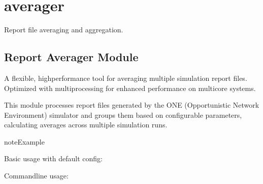 \documentclass[a4paper,11pt,english,openany,oneside]{sphinxmanual}
\begin{document}
\section{averager}
\label{\detokenize{modules/core:averager}}
\sphinxAtStartPar
Report file averaging and aggregation.

\subsection{Report Averager Module}
\label{\detokenize{modules/core:report-averager-module}}\label{\detokenize{modules/core:module-core.averager}}
\sphinxAtStartPar
A flexible, high\sphinxhyphen{}performance tool for averaging multiple simulation report files.
Optimized with multiprocessing for enhanced performance on multi\sphinxhyphen{}core systems.

\sphinxAtStartPar
This module processes report files generated by the ONE (Opportunistic Network
Environment) simulator and groups them based on configurable parameters,
calculating averages across multiple simulation runs.

\begin{sphinxadmonition}{note}{Example}

\sphinxAtStartPar
Basic usage with default config:

\begin{sphinxVerbatim}[commandchars=\\\{\}]
 

  
\end{sphinxVerbatim}

\sphinxAtStartPar
Command\sphinxhyphen{}line usage:

\begin{sphinxVerbatim}[commandchars=\\\{\}]
 
\end{sphinxVerbatim}
\end{sphinxadmonition}
\end{document}
